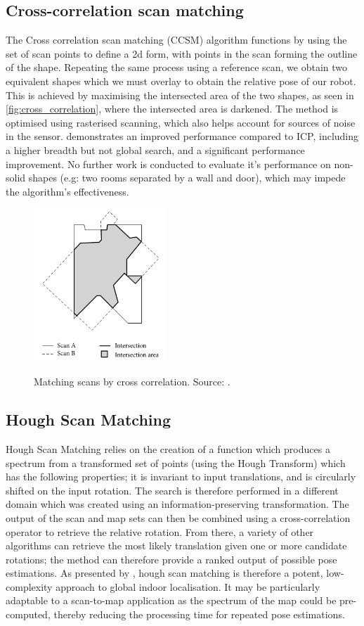 \documentclass[authoryearcitations]{UoYCSproject}
\begin{document}
\subsection{Cross-correlation scan matching}
The Cross correlation scan matching (CCSM) algorithm functions by using the set of scan points to define a 2d form, with points in the scan forming the outline of the shape. Repeating the same process using a reference scan, we obtain two equivalent shapes which we must overlay to obtain the relative pose of our robot. This is achieved by maximising the intersected area of the two shapes, as seen in \autoref{fig:cross_correlation}, where the intersected area is darkened. The method is optimised using rasterised scanning, which also helps account for sources of noise in the sensor. \citet{Konecny2016-zv} demonstrates an improved performance compared to ICP, including a higher breadth but not global search, and a significant performance improvement. No further work is conducted to evaluate it's performance on non-solid shapes (e.g: two rooms separated by a wall and door), which may impede the algorithm's effectiveness. 

\begin{figure}[t]
	\centering
	\includegraphics[width=5cm,keepaspectratio]{images/cross_correlation.png}
	\label{fig:cross_correlation}
	\caption{Matching scans by cross correlation. Source: \citet{Konecny2016-zv}.}
\end{figure}

\subsection{Hough Scan Matching}
Hough Scan Matching relies on the creation of a function which produces a spectrum from a transformed set of points (using the Hough Transform) which has the following properties; it is invariant to input translations, and is circularly shifted on the input rotation. The search is therefore performed in a different domain which was created using an information-preserving transformation. The output of the scan and map sets can then be combined using a cross-correlation operator to retrieve the relative rotation. From there, a variety of other algorithms can retrieve the most likely translation given one or more candidate rotations; the method can therefore provide a ranked output of possible pose estimations. As presented by \citet{Censi2005-iv}, hough scan matching is therefore a potent, low-complexity approach to global indoor localisation. It may be particularly adaptable to a scan-to-map application as the spectrum of the map could be pre-computed, thereby reducing the processing time for repeated pose estimations.
\end{document}
